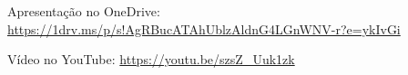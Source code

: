 Apresentação no OneDrive: \url{https://1drv.ms/p/s!AgRBucATAhUblzAldnG4LGnWNV-r?e=ykIvGi} \\
\begin{center}
    \href{https://1drv.ms/p/s!AgRBucATAhUblzAldnG4LGnWNV-r?e=ykIvGi}{
    }
\end{center}


Vídeo no YouTube: \url{https://youtu.be/szsZ_Uuk1zk} \\
\begin{center}
    \href{https://youtu.be/szsZ_Uuk1zk}{
    }
\end{center}
